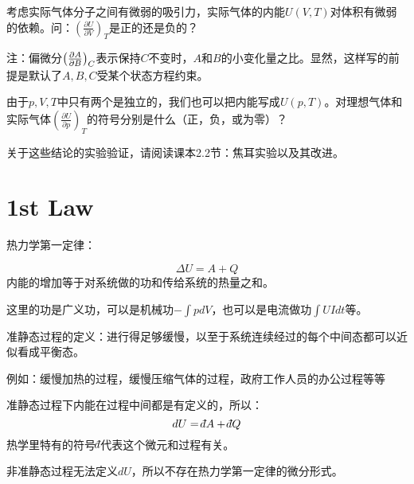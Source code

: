 \documentclass[CJK]{beamer}
\begin{document}
\begin{frame}
\bch
{}

考虑实际气体分子之间有微弱的吸引力，实际气体的内能$U(V,T)$对体积有微弱的依赖。问：$\left(\frac{\partial U}{\partial V}\right)_T$是正的还是负的？

\skiplines

注：偏微分$\left(\frac{\partial A}{\partial B}\right)_{C}$表示保持$C$不变时，$A$和$B$的小变化量之比。显然，这样写的前提是默认了$A,B,C$受某个状态方程约束。
\ech
\end{frame}


\begin{frame}
\bch
{}

由于$p, V, T$中只有两个是独立的，我们也可以把内能写成$U(p, T)$。对理想气体和实际气体$\left(\frac{\partial U}{\partial p}\right)_T$的符号分别是什么（正，负，或为零）？

\skiplines

关于这些结论的实验验证，请阅读课本2.2节：焦耳实验以及其改进。
\ech
\end{frame}


\section{1st Law}

\begin{frame}
\bch
热力学第一定律：

{\blue
$$ \Delta U = A + Q$$
内能的增加等于对系统做的功和传给系统的热量之和。
}

\skiplines

这里的功是{\blue 广义功}，可以是机械功$-\int pdV$，也可以是电流做功$\int UIdt$等。
\ech
\end{frame}


\begin{frame}
\bch
准静态过程的定义：{\blue 进行得足够缓慢，以至于系统连续经过的每个中间态都可以近似看成平衡态。}

\skiplines

{\small 例如：缓慢加热的过程，缓慢压缩气体的过程，政府工作人员的办公过程等等}


\ech
\end{frame}


\begin{frame}
\bch
准静态过程下内能在过程中间都是有定义的，所以：
{\blue
$$dU = \dbar A + \dbar Q$$
}
热学里特有的符号$\dbar$代表这个微元和过程有关。

\skiplines

非准静态过程无法定义$dU$，所以不存在热力学第一定律的微分形式。
\ech
\end{frame}
\end{document}
